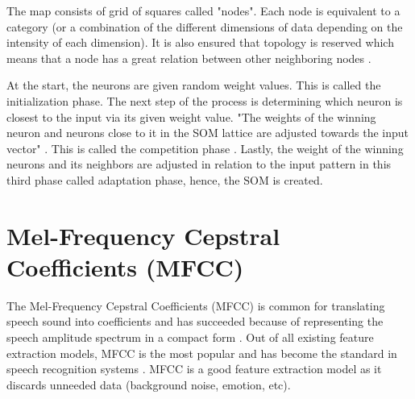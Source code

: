 The map consists of grid of squares called "nodes". Each node is equivalent to a category (or a combination of the different dimensions of data depending on the intensity of each dimension). It is also ensured that topology is reserved which means that a node has a great relation between other neighboring nodes \cite{li:2008:som}.

At the start, the neurons are given random weight values. This is called the initialization phase. The next step of the process is determining which neuron is closest to the input via its given weight value. "The weights of the winning neuron and neurons close to it in the SOM lattice are adjusted towards the input vector" \cite{chandar:2013:srs}. This is called the competition phase \cite{agustin:2014:SOM}. Lastly, the weight of the winning neurons and its neighbors are adjusted in relation to the input pattern in this third phase called adaptation phase, hence, the SOM is created.

\begin{comment}
For example, considering Natalie Agustin's \citeyear{agustin:2014:SOM} thesis, the input of the system would be sound or audio, specifically vowel sounds from the user's voice. The 5 basic vowel sounds ('a', 'e', 'i', 'o', 'u') are considered to their own nodes (category) and everything else in between (i.e. combination of 'a' and 'e' sound or longer 'oo' sound) will have their own nodes as well. The basic vowels are identified as the different dimensions, meaning we have 5-dimensional data. Once the system read an input, it will weigh in each dimension to the input and will be mapped accordingly to a node.
\end{comment}

\section{Mel-Frequency Cepstral Coefficients (MFCC)}
The Mel-Frequency Cepstral Coefficients (MFCC) is common for translating speech sound into coefficients and has succeeded because of representing the speech amplitude spectrum in a compact form \cite{logan:2000:mel}. Out of all existing feature extraction models, MFCC is the most popular and has become the standard in speech recognition systems \cite{Sahidullah2012543}. MFCC is a good feature extraction model as it discards unneeded data (background noise, emotion, etc).

